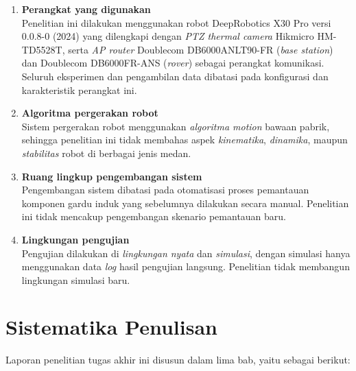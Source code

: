\begin{enumerate}
    \item\textbf{Perangkat yang digunakan} \\
    Penelitian ini dilakukan menggunakan robot DeepRobotics X30 Pro versi 0.0.8-0 (2024) yang dilengkapi dengan \emph{ PTZ thermal camera} Hikmicro HM-TD5528T, serta \emph{AP router} Doublecom DB6000ANLT90-FR (\emph{base station}) dan Doublecom DB6000FR-ANS (\emph{rover}) sebagai perangkat komunikasi. Seluruh eksperimen dan pengambilan data dibatasi pada konfigurasi dan karakteristik perangkat ini.
    
    \item \textbf{Algoritma pergerakan robot} \\
    Sistem pergerakan robot menggunakan \emph{algoritma motion} bawaan pabrik, sehingga penelitian ini tidak membahas aspek \emph{kinematika}, \emph{dinamika}, maupun \emph{stabilitas} robot di berbagai jenis medan.

    \item \textbf{Ruang lingkup pengembangan sistem} \\
    Pengembangan sistem dibatasi pada otomatisasi proses pemantauan komponen gardu induk yang sebelumnya dilakukan secara manual. Penelitian ini tidak mencakup pengembangan skenario pemantauan baru.

    \item \textbf{Lingkungan pengujian} \\
    Pengujian dilakukan di \emph{lingkungan nyata} dan \emph{simulasi}, dengan simulasi hanya menggunakan data \emph{log} hasil pengujian langsung. Penelitian tidak membangun lingkungan simulasi baru.
\end{enumerate}



\section{Sistematika Penulisan}
\label{sec:sistematikapenulisan}

Laporan penelitian tugas akhir ini disusun dalam lima bab, yaitu sebagai berikut:

